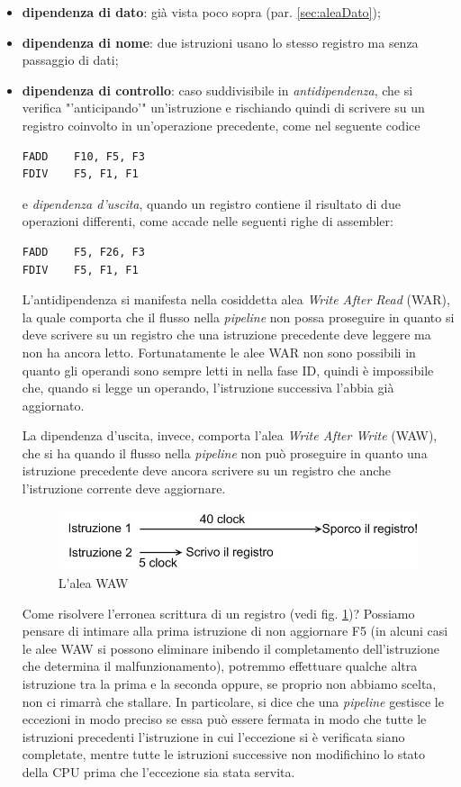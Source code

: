 \begin{itemize}
\item \textbf{dipendenza di dato}: già vista poco sopra (par. \ref{sec:aleaDato});
\item \textbf{dipendenza di nome}: due istruzioni usano lo stesso registro ma senza passaggio di dati;
\item \textbf{dipendenza di controllo}: caso suddivisibile in \textit{antidipendenza}, che si verifica "'anticipando'" un'istruzione e rischiando quindi di scrivere su un registro coinvolto in un'operazione precedente, come nel seguente codice
\begin{verbatim}
FADD    F10, F5, F3
FDIV    F5, F1, F1
\end{verbatim}
e \textit{dipendenza d'uscita}, quando un registro contiene il risultato di due operazioni differenti, come accade nelle seguenti righe di assembler:
\begin{verbatim}
FADD    F5, F26, F3
FDIV    F5, F1, F1
\end{verbatim}

L'antidipendenza si manifesta nella cosiddetta alea \textit{Write After Read} (WAR), la quale comporta che il flusso nella \textit{pipeline} non possa proseguire in quanto si deve scrivere su un registro che una istruzione precedente deve leggere ma non ha ancora letto. Fortunatamente le alee WAR non sono possibili in quanto gli operandi
sono sempre letti in nella fase ID, quindi è impossibile che, quando si legge un operando, l'istruzione successiva
l'abbia già aggiornato.

La dipendenza d'uscita, invece, comporta l'alea \textit{Write After Write} (WAW), che si ha quando il flusso nella \textit{pipeline} non può proseguire in quanto una istruzione precedente deve ancora scrivere su un registro che anche
l'istruzione corrente deve aggiornare.
\begin{figure}[!h]
\centering
\includegraphics[width=0.7\columnwidth]{img/areaWAW}
\caption{L'alea WAW}
\label{fig:areaWAW}
\end{figure}
Come risolvere l'erronea scrittura di un registro (vedi fig. \ref{fig:areaWAW})? Possiamo pensare di intimare alla prima istruzione di non aggiornare F5 (in alcuni casi le alee WAW si possono eliminare inibendo il
completamento dell'istruzione che determina il malfunzionamento), potremmo effettuare qualche altra istruzione tra la prima e la seconda oppure, se proprio non abbiamo scelta, non ci rimarrà che stallare. In particolare, si dice che una \textit{pipeline} gestisce le eccezioni in modo preciso se essa può essere fermata in modo che tutte le istruzioni precedenti l'istruzione in cui l'eccezione si è verificata siano completate, mentre tutte le istruzioni successive non modifichino lo stato della CPU prima che l'eccezione sia stata servita.
\end{itemize}

